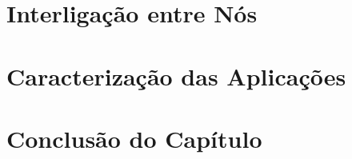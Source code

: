 \documentclass[tese,capa]{texufpel}
\begin{document}


\section{Interligação entre Nós}\label{sec:rede}
\section{Caracterização das Aplicações}\label{sec:caracaplic}
\section{Conclusão do Capítulo}\label{sec:concap}


\end{document}
